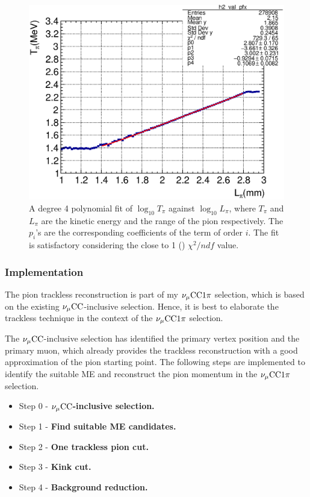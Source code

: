            \begin{figure}[h]
              \centering
              \includegraphics[width=\sgfidwid\textwidth]{figures/pi_len_pi_len_vs_pi_ke_hist2d_al0_true_nokink.eps} 
              \caption{A degree 4 polynomial fit of $\log_{10}{T_\pi}$ against $\log_{10}{L_\pi}$, where $T_\pi$ and $L_\pi$ are the kinetic energy and the range of the pion respectively. The $p_i$'s are the corresponding coefficients of the term of order $i$. The fit is satisfactory considering the close to 1 () $\chi^2/ndf$ value. }
              \label{fig:fit}
           \end{figure}

        \subsubsection{Implementation}
            The pion trackless reconstruction is part of my $\nu_{\mu}\textrm{CC}1\pi$ selection, which is based on the existing $\nu_{\mu}\textrm{CC}$-inclusive selection. Hence, it is best to elaborate the trackless technique in the context of the $\nu_{\mu}\textrm{CC}1\pi$ selection. 
        
            The $\nu_{\mu}\textrm{CC}$-inclusive selection has identified the primary vertex position and the primary muon, which already provides the trackless reconstruction with a good approximation of the pion starting point. The following steps are implemented to identify the suitable ME and reconstruct the pion momentum in the $\nu_{\mu}\textrm{CC}1\pi$ selection. 

            \begin{itemize}
                \item Step 0 - \textbf{$\nu_{\mu}\textrm{CC}$-inclusive selection.}
                \item Step 1 - \textbf{Find suitable ME candidates.} 
                \item Step 2 - \textbf{One trackless pion cut.}
                \item Step 3 - \textbf{Kink cut.}
                \item Step 4 - \textbf{Background reduction.}
            \end{itemize}
        
